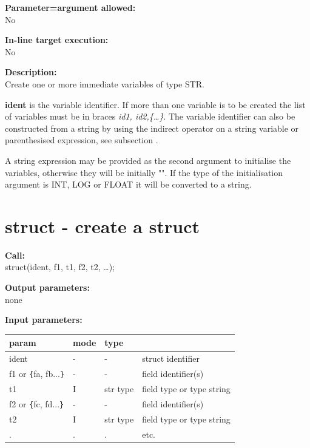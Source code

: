         {\bf Parameter=argument allowed:} \\
        No
        
        {\bf In-line target execution:} \\
        No
        
        {\bf Description:} \\
        Create one or more immediate variables of type STR.
        
        {\bf ident} is the variable identifier. If more than one
        variable is to be created the list of variables must be in braces
        {\em id1, id2,\{\dots\}}. The variable identifier can also be constructed
        from a string by using the indirect operator on a string variable or
        parenthesised expression, see subsection .
        
        A string expression may be provided as the second
        argument to initialise the variables, otherwise they will be
        initially "". If the type of the initialisation argument is
        INT, LOG or FLOAT it will be converted to a string.


    \section{struct - create a struct}\label{sec:ipstruct}
        
        {\bf Call:} \\
        struct(ident, f1, t1, f2, t2, \dots);
        
        {\bf Output parameters:} \\
        none
        
        {\bf Input parameters:} \\
        \begin{tabular}{| l | l | l | l |}
        \hline
        param  & mode & type & \\
        \hline \hline
        ident             & - &  -       & struct identifier         \\ \hline
        f1 or \verb'{'fa, fb...\verb'}' & - &  -       & field identifier(s)       \\ \hline
        t1                & I & str type & field type or type string \\ \hline
        f2 or \verb'{'fc, fd...\verb'}' & - &  -       & field identifier(s)       \\ \hline
        t2                & I & str type & field type or type string \\ \hline
         .                & . &  .       & etc.                      \\ \hline
        \end{tabular}
        
